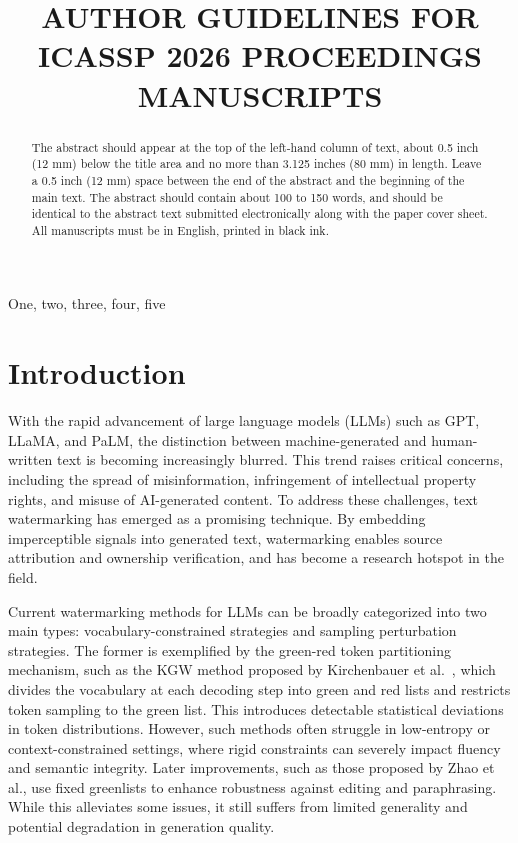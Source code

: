 \documentclass{article}
\title{AUTHOR GUIDELINES FOR ICASSP 2026 PROCEEDINGS MANUSCRIPTS}
\begin{document}
%
\maketitle
%
\begin{abstract}
The abstract should appear at the top of the left-hand column of text, about
0.5 inch (12 mm) below the title area and no more than 3.125 inches (80 mm) in
length.  Leave a 0.5 inch (12 mm) space between the end of the abstract and the
beginning of the main text.  The abstract should contain about 100 to 150
words, and should be identical to the abstract text submitted electronically
along with the paper cover sheet.  All manuscripts must be in English, printed
in black ink.
\end{abstract}
%
\begin{keywords}
One, two, three, four, five
\end{keywords}
%
\section{Introduction}
\label{sec:intro}With the rapid advancement of large language models (LLMs) such as GPT, LLaMA, and PaLM, the distinction between machine-generated and human-written text is becoming increasingly blurred. This trend raises critical concerns, including the spread of misinformation, infringement of intellectual property rights, and misuse of AI-generated content. To address these challenges, text watermarking has emerged as a promising technique. By embedding imperceptible signals into generated text, watermarking enables source attribution and ownership verification, and has become a research hotspot in the field.

Current watermarking methods for LLMs can be broadly categorized into two main types: vocabulary-constrained strategies and sampling perturbation strategies. The former is exemplified by the green-red token partitioning mechanism, such as the KGW method proposed by Kirchenbauer et al.~\cite{kirchenbauer2023watermark}, which divides the vocabulary at each decoding step into green and red lists and restricts token sampling to the green list. This introduces detectable statistical deviations in token distributions. However, such methods often struggle in low-entropy or context-constrained settings, where rigid constraints can severely impact fluency and semantic integrity. Later improvements, such as those proposed by Zhao et al., use fixed greenlists to enhance robustness against editing and paraphrasing. While this alleviates some issues, it still suffers from limited generality and potential degradation in generation quality.
\end{document}
